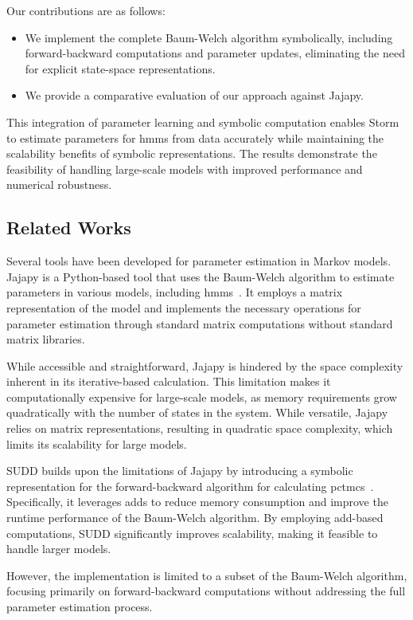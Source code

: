 Our contributions are as follows:
\begin{itemize}
    \item We implement the complete Baum-Welch algorithm symbolically, including forward-backward computations and parameter updates, eliminating the need for explicit state-space representations.
    \item We provide a comparative evaluation of our approach against Jajapy.
\end{itemize}

This integration of parameter learning and symbolic computation enables Storm to estimate parameters for \glspl{hmm} from data accurately while maintaining the scalability benefits of symbolic representations.
The results demonstrate the feasibility of handling large-scale models with improved performance and numerical robustness.

\subsection{Related Works}\label{subsec:related-works}
Several tools have been developed for parameter estimation in Markov models. 
Jajapy is a Python-based tool that uses the Baum-Welch algorithm to estimate parameters in various models, including \glspl{hmm}~\cite{reynouard2023jajapy}. 
It employs a matrix representation of the model and implements the necessary operations for parameter estimation through standard matrix computations without standard matrix libraries.

While accessible and straightforward, Jajapy is hindered by the space complexity inherent in its iterative-based calculation.
This limitation makes it computationally expensive for large-scale models, as memory requirements grow quadratically with the number of states in the system.
While versatile, Jajapy relies on matrix representations, resulting in quadratic space complexity, which limits its scalability for large models.

SUDD builds upon the limitations of Jajapy by introducing a symbolic representation for the forward-backward algorithm for calculating \glspl{pctmc}~\cite{p7}.
Specifically, it leverages \glspl{add} to reduce memory consumption and improve the runtime performance of the Baum-Welch algorithm.
By employing \gls{add}-based computations, SUDD significantly improves scalability, making it feasible to handle larger models.

However, the implementation is limited to a subset of the Baum-Welch algorithm, focusing primarily on forward-backward computations without addressing the full parameter estimation process. 

